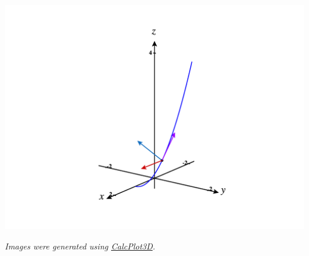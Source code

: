 \documentclass{ximera}
\begin{document}
\begin{example}
\begin{image}
\includegraphics[width = \textwidth]{CalcPlot3D-tnb_parabola}
\end{image}
\end{example}

\textit{Images were generated using \href{https://www.monroecc.edu/faculty/paulseeburger/calcnsf/CalcPlot3D/}{CalcPlot3D}.}
\end{document}
